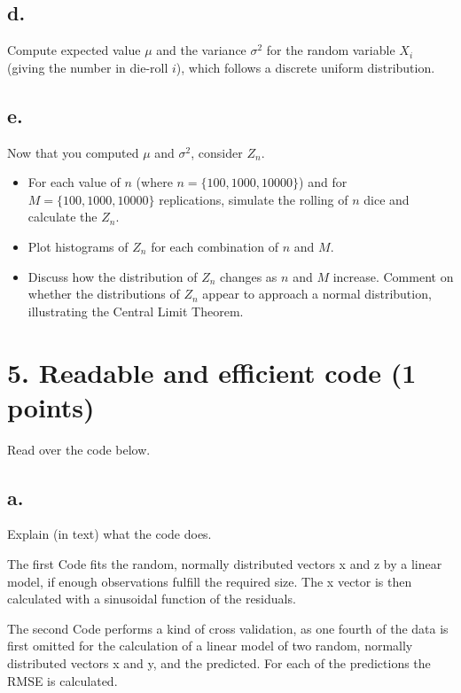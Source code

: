 \documentclass[
]{article}
\begin{document}
\subsection{d.}\label{d.-2}

Compute expected value \(\mu\) and the variance \(\sigma^2\) for the
random variable \(X_i\) (giving the number in die-roll \(i\)), which
follows a discrete uniform distribution.

\subsection{e.}\label{e.-1}

Now that you computed \(\mu\) and \(\sigma^2\), consider \(Z_n\).

\begin{itemize}
\item
  For each value of \(n\) (where \(n=\{100,1000,10000\}\)) and for
  \(M=\{100,1000,10000\}\) replications, simulate the rolling of \(n\)
  dice and calculate the \(Z_n\).
\item
  Plot histograms of \(Z_n\) for each combination of \(n\) and \(M\).
\item
  Discuss how the distribution of \(Z_n\) changes as \(n\) and \(M\)
  increase. Comment on whether the distributions of \(Z_n\) appear to
  approach a normal distribution, illustrating the Central Limit
  Theorem.
\end{itemize}

\section{5. Readable and efficient code (1
points)}\label{readable-and-efficient-code-1-points}

Read over the code below.

\subsection{a.}\label{a.-4}

Explain (in text) what the code does.

The first Code fits the random, normally distributed vectors x and z by
a linear model, if enough observations fulfill the required size. The x
vector is then calculated with a sinusoidal function of the residuals.

The second Code performs a kind of cross validation, as one fourth of
the data is first omitted for the calculation of a linear model of two
random, normally distributed vectors x and y, and the predicted. For
each of the predictions the RMSE is calculated.
\end{document}
